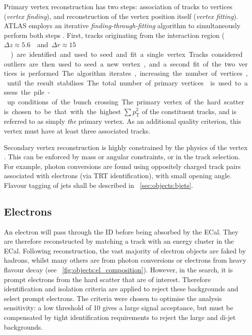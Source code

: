 Primary vertex reconstruction has two steps: association of tracks to vertices 
(\textit{vertex finding}), and reconstruction of the vertex position itself 
(\textit{vertex fitting}). ATLAS employs an iterative \textit{finding-through-fitting} 
algorithm to simultaneously perform both steps \cite{PrimVertexFinding,AllVertexFinding}.
First, tracks originating from the interaction region 
(\unit{$\Delta z \approx 5.6$}{\centi\metre} and 
\unit{$\Delta r \approx 15$}{\micro\metre}) are identified and used to seed and fit a 
single vertex. Tracks considered outliers are then used to seed a new vertex, and a 
second fit of the two vertices is performed. The algorithm iterates, increasing the 
number of vertices, until the result stabilises.

The total number of primary vertices \npv is used to assess the pile-up conditions of 
the bunch crossing. The primary vertex of the hard scatter is chosen to be that with the 
highest $\sum p_{\text{T}}^2$ of the constituent tracks, and is referred to as simply \textit{the} 
primary vertex. As an additional quality criterion, this vertex must have at least three 
associated tracks.

Secondary vertex reconstruction is highly constrained by the physics of the vertex 
\cite{AllVertexFinding}. This can be enforced by mass or angular constraints, or in the 
track selection. For example, photon conversions are found using oppositely charged 
track pairs associated with electrons (via \acs{TRT} identification), with small 
opening angle. 
Flavour tagging of jets shall be described in \Section~\ref{sec:objects:bjets}.



\subsection{Electrons}
\label{sec:objects:electrons}

An electron will pass through the \ac{ID} before being absorbed by the \ac{ECal}. They 
are therefore reconstructed by matching a track with an energy cluster in the \ac{ECal}. 
Following reconstruction, the vast majority of electron objects are faked by hadrons, 
whilst many others are from photon conversions or electrons from heavy flavour decay (see 
\Figure~\ref{fig:objects:el_composition}). However, in the \HWWlvlv search, it is prompt 
electrons from the hard scatter that are of interest. Therefore identification and 
isolation criteria are applied to reject these backgrounds and select prompt electrons. 
The criteria were chosen to optimise the analysis sensitivity: \eg a low \et threshold 
of \unit{10}{\GeV} gives a large signal acceptance, but must be compensated by tight 
identification requirements to reject the large \Wjets and di-jet backgrounds.

